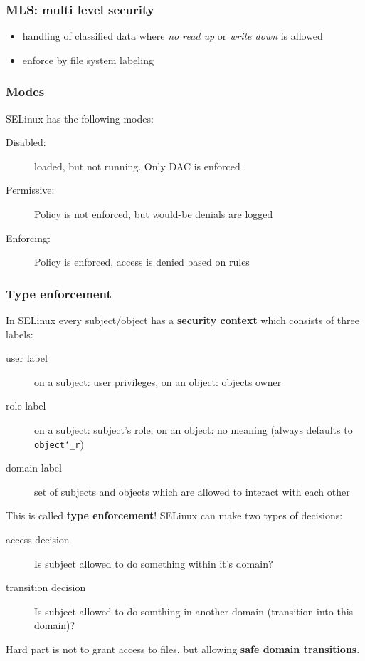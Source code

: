 \subsubsection{MLS:  multi level security}
\begin{itemize}
  \item handling of classified data where \textit{no read up} or \textit{write down} is allowed
  \item enforce by file system labeling
\end{itemize}

\subsubsection{Modes}
SELinux has the following modes:

\begin{description}
  \item[Disabled:] loaded, but not running. Only DAC is enforced
  \item[Permissive:]  Policy is not enforced, but would-be denials are logged
  \item[Enforcing:] Policy is enforced, access is denied based on rules
\end{description}
\subsubsection{Type enforcement}

In SELinux every subject/object has a \textbf{security context} which consists of three labels:\vspace{-1.5mm}
\begin{description}
    \item[user label] on a subject: user privileges, on an object: objects owner
    \item[role label]  on a subject: subject's role, on an object: no meaning (always defaults to \texttt{object\char`_r})
    \item[domain label] set of subjects and objects which are allowed to interact with each other
\end{description}
This is called \textbf{type enforcement}! SELinux can make two types of decisions:\vspace{-1.5mm}
\begin{description}
    \item[access decision] Is subject allowed to do something within it's domain?
    \item[transition decision] Is subject allowed to do somthing in another domain (transition into this domain)?
\end{description}
Hard part is not to grant access to files, but allowing \textbf{safe domain transitions}.

